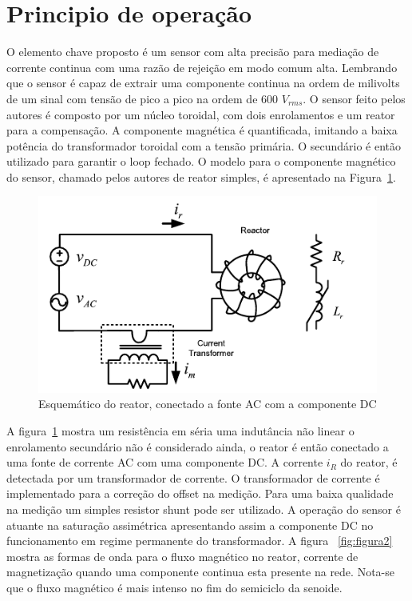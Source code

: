 \documentclass[paper=a4, fontsize=11pt]{article}
\begin{document}
\section{Principio de operação}

O elemento chave proposto é um sensor com alta precisão para mediação de corrente
continua com uma razão de rejeição em modo comum alta. Lembrando que o sensor 
é capaz de extrair uma componente continua na ordem de milivolts de um sinal
com tensão de pico a pico na ordem de 600 $V_{rms}$. O sensor feito pelos autores
é composto por um núcleo toroidal, com dois enrolamentos e um reator para a compensação.
A componente magnética é quantificada, imitando a baixa potência do transformador
toroidal com a tensão primária. O secundário é então utilizado para garantir o 
loop fechado. O modelo para o componente magnético do sensor, chamado pelos autores
de reator simples, é apresentado na Figura~\ref{fig:figura1}.

\begin{figure}[!ht]
	\centering
	\includegraphics[scale=.8]{fig1.png}
    \caption{Esquemático do reator, conectado a fonte AC com a componente DC}
    \label{fig:figura1}
\end{figure}

A figura~\ref{fig:figura1} mostra um resistência em séria uma indutância não linear
o enrolamento secundário não é considerado ainda, o reator é então conectado a
uma fonte de corrente AC com uma componente DC. A corrente $i_R$ do reator, é
detectada por um transformador de corrente. O transformador de corrente
é implementado para a correção do offset na medição. Para uma baixa qualidade na 
medição um simples resistor shunt pode ser utilizado.
A operação do sensor é atuante na saturação assimétrica apresentando assim a componente
DC no funcionamento em regime permanente do transformador. A figura ~\ref{fig:figura2} 
mostra as formas de onda para o fluxo magnético no reator, corrente de magnetização
quando uma componente continua esta presente na rede. Nota-se que o fluxo magnético é
mais intenso no fim do semiciclo da senoide.
\end{document}
